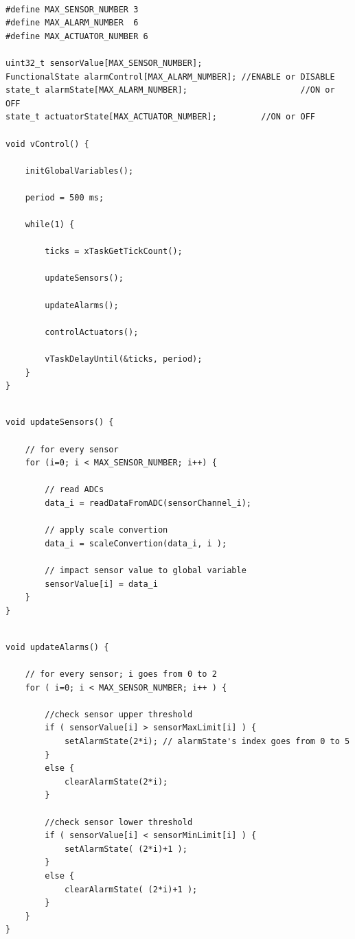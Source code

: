 \vspace{20px}
\begin{lstlisting}[caption=Pseudocódigo del lazo principal de control.]  % Start your code-block

#define MAX_SENSOR_NUMBER 3
#define MAX_ALARM_NUMBER  6
#define MAX_ACTUATOR_NUMBER 6

uint32_t sensorValue[MAX_SENSOR_NUMBER];		
FunctionalState alarmControl[MAX_ALARM_NUMBER];	//ENABLE or DISABLE
state_t alarmState[MAX_ALARM_NUMBER];						//ON or OFF
state_t actuatorState[MAX_ACTUATOR_NUMBER];			//ON or OFF

void vControl() {

	initGlobalVariables();
	
	period = 500 ms;
		
	while(1) {

		ticks = xTaskGetTickCount();
		
		updateSensors();
		
		updateAlarms();
		
		controlActuators();
		
		vTaskDelayUntil(&ticks, period);
	}
}
\end{lstlisting}

\vspace{20px}
\begin{lstlisting}[caption=Pseudocódigo del control de los sensores.]  % Start your code-block

void updateSensors() {

	// for every sensor
	for (i=0; i < MAX_SENSOR_NUMBER; i++) {

		// read ADCs
		data_i = readDataFromADC(sensorChannel_i);

		// apply scale convertion 
		data_i = scaleConvertion(data_i, i );
	
		// impact sensor value to global variable 
		sensorValue[i] = data_i
	}
}
\end{lstlisting}

\vspace{20px}
\begin{lstlisting}[caption=Pseudocódigo del control de las alarmas.]  % Start your code-block

void updateAlarms() {

	// for every sensor; i goes from 0 to 2
	for ( i=0; i < MAX_SENSOR_NUMBER; i++ ) {
		
		//check sensor upper threshold
		if ( sensorValue[i] > sensorMaxLimit[i] ) {
			setAlarmState(2*i);	// alarmState's index goes from 0 to 5
		}
		else {
			clearAlarmState(2*i);
		}

		//check sensor lower threshold
		if ( sensorValue[i] < sensorMinLimit[i] ) {
			setAlarmState( (2*i)+1 );
		}
		else {
			clearAlarmState( (2*i)+1 );
		}
	}
}
\end{lstlisting}

